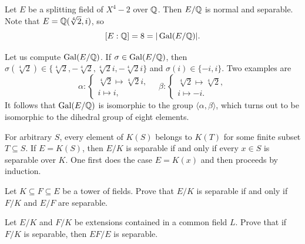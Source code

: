 \begin{example}
    Let $E$ be a splitting field of $X^4-2$ over $\mathbb{Q}$. 
    Then $E/\mathbb{Q}$ is normal and separable. Note that
    $E=\mathbb{Q}(\sqrt[4]{2},i)$, so 
    \[
    [E:\mathbb{Q}]=8=|\operatorname{Gal}(E/\mathbb{Q})|.
    \]
    
    Let us compute
    $\operatorname{Gal}(E/\mathbb{Q})$. If $\sigma\in\operatorname{Gal}(E/\mathbb{Q})$, then 
    $\sigma(\sqrt[4]{2})\in\{\sqrt[4]{2},-\sqrt[4]{2},\sqrt[4]{2}i,-\sqrt[4]{2}i\}$ and 
    $\sigma(i)\in\{-i,i\}$. Two examples are 
    \[
    \alpha\colon\begin{cases}
    \sqrt[4]{2}\mapsto\sqrt[4]{2}i,\\
    i\mapsto i,
    \end{cases}
    \quad
    \beta\colon\begin{cases}
    \sqrt[4]{2}\mapsto\sqrt[4]{2},\\
    i\mapsto -i.
    \end{cases}
    \]
    It follows that 
    $\operatorname{Gal}(E/\mathbb{Q})$ is isomorphic to the group $\langle\alpha,\beta\rangle$, which turns out to be
    isomorphic to the dihedral group
    of eight elements. 
\end{example}

For arbitrary $S$, every element of $K(S)$ belongs to $K(T)$ for some finite subset $T\subseteq S$.
If $E=K(S)$, then $E/K$ is separable if and only if
every $x\in S$ is separable over $K$. One first does the case $E=K(x)$ 
and then proceeds by induction.

\begin{exercise}
\label{xca:separable1}
    Let $K\subseteq F\subseteq E$ be a tower of fields. Prove that 
    $E/K$ is separable if and only if $F/K$ and $E/F$ are separable. 
\end{exercise}



\begin{exercise}
\label{xca:separable2}
    Let $E/K$ and $F/K$ be extensions contained in a common field $L$. Prove that if $F/K$ is separable, 
    then $EF/E$ is separable. 
\end{exercise}

